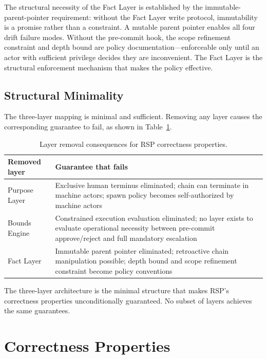 The structural necessity of the Fact Layer is established by the immutable-parent-pointer requirement: without the Fact Layer write protocol, immutability is a promise rather than a constraint. A mutable parent pointer enables all four drift failure modes. Without the pre-commit hook, the scope refinement constraint and depth bound are policy documentation---enforceable only until an actor with sufficient privilege decides they are inconvenient. The Fact Layer is the structural enforcement mechanism that makes the policy effective.

\subsection{Structural Minimality}
\label{sec:rs-minimality}

The three-layer mapping is minimal and sufficient. Removing any layer causes the corresponding guarantee to fail, as shown in Table~\ref{tab:layer-minimality-rs}.

\begin{table}[h]
\centering
\begin{tabular}{p{3.2cm} p{4.8cm}}
\toprule
\textbf{Removed layer} & \textbf{Guarantee that fails} \\
\midrule
Purpose Layer & Exclusive human terminus eliminated; chain can terminate in machine actors; spawn policy becomes self-authorized by machine actors \\
Bounds Engine & Constrained execution evaluation eliminated; no layer exists to evaluate operational necessity between pre-commit approve/reject and full mandatory escalation \\
Fact Layer & Immutable parent pointer eliminated; retroactive chain manipulation possible; depth bound and scope refinement constraint become policy conventions \\
\bottomrule
\end{tabular}
\caption{Layer removal consequences for RSP correctness properties.}
\label{tab:layer-minimality-rs}
\end{table}

The three-layer architecture is the minimal structure that makes RSP's correctness properties unconditionally guaranteed. No subset of layers achieves the same guarantees.

\section{Correctness Properties}
\label{sec:rs-correctness}

